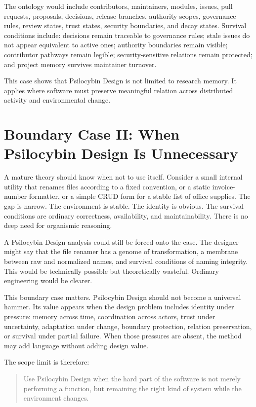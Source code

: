 \documentclass[11pt]{article}
\begin{document}
The ontology would include contributors, maintainers, modules, issues, pull requests, proposals, decisions, release branches, authority scopes, governance rules, review states, trust states, security boundaries, and decay states. Survival conditions include: decisions remain traceable to governance rules; stale issues do not appear equivalent to active ones; authority boundaries remain visible; contributor pathways remain legible; security-sensitive relations remain protected; and project memory survives maintainer turnover.

This case shows that Psilocybin Design is not limited to research memory. It applies where software must preserve meaningful relation across distributed activity and environmental change.

\section{Boundary Case II: When Psilocybin Design Is Unnecessary}

A mature theory should know when not to use itself. Consider a small internal utility that renames files according to a fixed convention, or a static invoice-number formatter, or a simple CRUD form for a stable list of office supplies. The gap is narrow. The environment is stable. The identity is obvious. The survival conditions are ordinary correctness, availability, and maintainability. There is no deep need for organismic reasoning.

A Psilocybin Design analysis could still be forced onto the case. The designer might say that the file renamer has a genome of transformation, a membrane between raw and normalized names, and survival conditions of naming integrity. This would be technically possible but theoretically wasteful. Ordinary engineering would be clearer.

This boundary case matters. Psilocybin Design should not become a universal hammer. Its value appears when the design problem includes identity under pressure: memory across time, coordination across actors, trust under uncertainty, adaptation under change, boundary protection, relation preservation, or survival under partial failure. When those pressures are absent, the method may add language without adding design value.

The scope limit is therefore:

\begin{quote}
Use Psilocybin Design when the hard part of the software is not merely performing a function, but remaining the right kind of system while the environment changes.
\end{quote}
\end{document}
